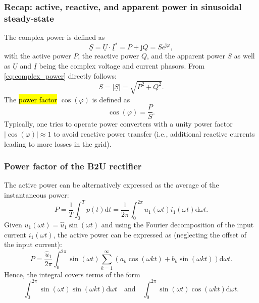 \begin{frame}
    \frametitle{Recap: active, reactive, and apparent power in sinusoidal steady-state}
    The complex power is defined as
    \begin{equation}
        \underline{S} = \underline{U} \cdot \underline{I}^* = P + \mathrm{j}Q = S e^{ \mathrm{j} \varphi},
        \label{eq:complex_power}
    \end{equation}
    with the active power $P$, the reactive power $Q$, and the apparent power $S$ as well as $\underline{U}$ and $\underline{I}$ being the complex voltage and current phasors. From \eqref{eq:complex_power} directly follows:
    \begin{equation}
        S = |\underline{S}| = \sqrt{P^2 + Q^2}.
    \end{equation}
    The \hl{power factor} $\cos(\varphi)$ is defined as
    \begin{equation}
        \cos(\varphi) = \frac{P}{S}.
    \end{equation}
    Typically, one tries to operate power converters with a unity power factor $|\cos(\varphi)|\approx 1$ to avoid reactive power transfer (i.e., additional reactive currents leading to more losses in the grid).
\end{frame}

\begin{frame}
    \frametitle{Power factor of the B2U rectifier}
    The active power can be alternatively expressed as the average of the instantaneous power:
    \begin{equation}
        P = \frac{1}{T} \int_{0}^{T} p(t) \mathrm{d}t = \frac{1}{2\pi} \int_{0}^{2\pi} u_1(\omega t) i_1(\omega t) \mathrm{d}\omega t.
    \end{equation}
    Given $u_1(\omega t) = \hat{u}_1 \sin(\omega t)$ and using the Fourier decomposition of the input current $i_1(\omega t)$, the active power can be expressed as (neglecting the offset of the input current):
    \begin{equation}
        P = \frac{\hat{u}_1}{2\pi} \int_{0}^{2\pi}  \sin(\omega t) \sum_{k=1}^\infty \left( a_k \cos(\omega k t) + b_k \sin(\omega k t) \right) \mathrm{d}\omega t.
    \end{equation}
    Hence, the integral covers terms of the form
    \begin{equation}
        \int_{0}^{2\pi} \sin(\omega t) \sin(\omega k t) \mathrm{d}\omega t  \quad \mbox{and} \quad \int_{0}^{2\pi} \sin(\omega t) \cos(\omega k t) \mathrm{d}\omega t.
    \end{equation}
    
\end{frame}
